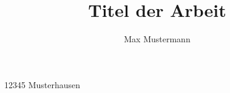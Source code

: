 

\title{Titel der Arbeit}
\author{Max Mustermann}
\address{Musterstraße 1}{12345 Musterhausen}
\writemeta



\maketitle
\thispagestyle{empty} %
\newpage

\thispagestyle{empty} %
\tableofcontents
\clearpage

\thispagestyle{empty} %
\listoffigures
\clearpage

\pagestyle{fancy}
\fancyhead[R]{\sffamily\thepage}
\fancyhead[L]{\sffamily\nouppercase{\leftmark}}
\fancyfoot[C]{\empty}




\clearpage

\printbibliography
\clearpage

\newpage
\thispagestyle{empty} %

\clearpage


